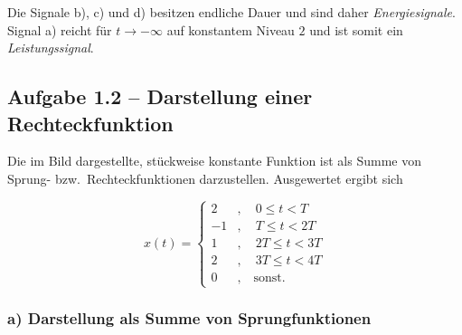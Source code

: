 \begin{bemerkung}
Die Signale b), c) und d) besitzen endliche Dauer und sind daher
\emph{Energiesignale}. Signal a) reicht für $t \to -\infty$ auf konstantem
Niveau $2$ und ist somit ein \emph{Leistungssignal}.
\end{bemerkung}

\subsection*{Aufgabe 1.2 – Darstellung einer Rechteckfunktion}

Die im Bild dargestellte, stückweise konstante Funktion ist als Summe von
Sprung- bzw.\ Rechteckfunktionen darzustellen. Ausgewertet ergibt sich

$$
x(t) = \begin{cases}
2 & , \quad 0 \leq t < T \\
-1 & , \quad T \leq t < 2T \\
1 & , \quad 2T \leq t < 3T \\
2 & , \quad 3T \leq t < 4T \\
0 & , \quad \text{sonst.}
\end{cases}
$$

\begin{center}
\end{center}

\subsubsection*{a) Darstellung als Summe von Sprungfunktionen}

